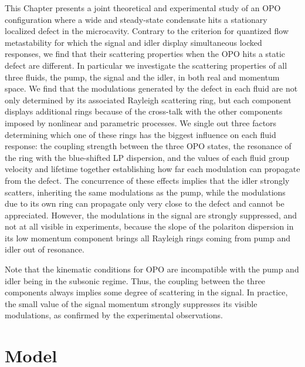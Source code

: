 This Chapter presents a joint theoretical and experimental study of an
OPO configuration where a wide and steady-state condensate hits a
stationary localized defect in the microcavity.
%
Contrary to the criterion for quantized flow metastability for which the
signal and idler display simultaneous locked responses, we find that
their scattering properties when the OPO hits a static defect are
different.
%
In particular we investigate the scattering properties of all three
fluids, the pump, the signal and the idler, in both real and momentum space. We
find that the modulations generated by the defect in each fluid are
not only determined by its associated Rayleigh scattering ring, but
each component displays additional rings because of the cross-talk
with the other components imposed by nonlinear and parametric
processes.
%
We single out three factors determining which one of these rings
has the biggest influence on each fluid response: the coupling strength between
the three OPO states, the resonance of the ring with the blue-shifted
LP dispersion, and the values of each fluid group velocity
and lifetime together establishing how far each modulation can
propagate from the defect.
%
The concurrence of these effects implies that the idler strongly
scatters, inheriting the same modulations as the pump, while the
modulations due to its own ring can propagate only very close to the
defect and cannot be appreciated. However, the modulations in the signal
are strongly suppressed, and not at all visible in experiments,
because the slope of the polariton dispersion in its low momentum
component brings all Rayleigh rings coming from pump and idler out of
resonance.

Note that the kinematic conditions for OPO are incompatible with the
pump and idler being in the subsonic regime. Thus, the coupling
between the three components always implies some degree of scattering
in the signal. In practice, the small value of the signal momentum
strongly suppresses its visible modulations, as confirmed by the
experimental observations.

\section{Model}
\label{sec:model-opo}

